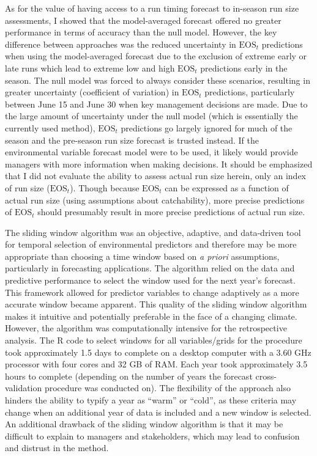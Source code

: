 \documentclass[12pt,]{book}
\theoremstyle{definition}
\theoremstyle{definition}
\theoremstyle{definition}
\theoremstyle{remark}
\begin{document}
As for the value of having access to a run timing forecast to in-season
run size assessments, I showed that the model-averaged forecast offered
no greater performance in terms of accuracy than the null model.
However, the key difference between approaches was the reduced
uncertainty in \(\text{EOS}_t\) predictions when using the
model-averaged forecast due to the exclusion of extreme early or late
runs which lead to extreme low and high \(\text{EOS}_t\) predictions
early in the season. The null model was forced to always consider these
scenarios, resulting in greater uncertainty (coefficient of variation)
in \(\text{EOS}_t\) predictions, particularly between June 15 and June
30 when key management decisions are made. Due to the large amount of
uncertainty under the null model (which is essentially the currently
used method), \(\text{EOS}_t\) predictions go largely ignored for much
of the season and the pre-season run size forecast is trusted instead.
If the environmental variable forecast model were to be used, it likely
would provide managers with more information when making decisions. It
should be emphasized that I did not evaluate the ability to assess
actual run size herein, only an index of run size (\(\text{EOS}_t\)).
Though because \(\text{EOS}_t\) can be expressed as a function of actual
run size (using assumptions about catchability), more precise
predictions of \(\text{EOS}_t\) should presumably result in more precise
predictions of actual run size.

The sliding window algorithm was an objective, adaptive, and data-driven
tool for temporal selection of environmental predictors and therefore
may be more appropriate than choosing a time window based on \emph{a
priori} assumptions, particularly in forecasting applications. The
algorithm relied on the data and predictive performance to select the
window used for the next year's forecast. This framework allowed for
predictor variables to change adaptively as a more accurate window
became apparent. This quality of the sliding window algorithm makes it
intuitive and potentially preferable in the face of a changing climate.
However, the algorithm was computationally intensive for the
retrospective analysis. The R code to select windows for all
variables/grids for the procedure took approximately 1.5 days to
complete on a desktop computer with a 3.60 GHz processor with four cores
and 32 GB of RAM. Each year took approximately 3.5 hours to complete
(depending on the number of years the forecast cross-validation
procedure was conducted on). The flexibility of the approach also
hinders the ability to typify a year as ``warm'' or ``cold'', as these
criteria may change when an additional year of data is included and a
new window is selected. An additional drawback of the sliding window
algorithm is that it may be difficult to explain to managers and
stakeholders, which may lead to confusion and distrust in the method.
\end{document}
